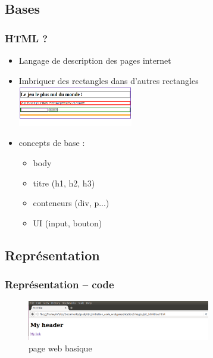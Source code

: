 \documentclass{beamer}
\newenvironment{code}{\captionsetup{type=listing}}{}
\begin{document}
	\subsection{Bases}
	\begin{frame}
		\frametitle{HTML ?}
		\begin{itemize}
			\item Langage de description des pages internet
			\item Imbriquer des rectangles dans d'autres rectangles
            \includegraphics[width=5cm]{images/html_structure.png}
			\item concepts de base : 
				\begin{itemize}
					\item body
					\item titre (h1, h2, h3)
					\item conteneurs (div, p...)
					\item UI (input, bouton)
				\end{itemize}
		\end{itemize}
    \end{frame}

	\subsection{Représentation}

	\begin{frame}[fragile]
		\frametitle{Représentation -- code}

		\begin{figure}
			\includegraphics[width=8cm]{images/page_html.png}
			\caption{page web basique}	
		\end{figure}
		
		\begin{code}
			\inputminted{html}{images/pic_htmltree.html}
		\end{code}				
		
	\end{frame}		
\end{document}
